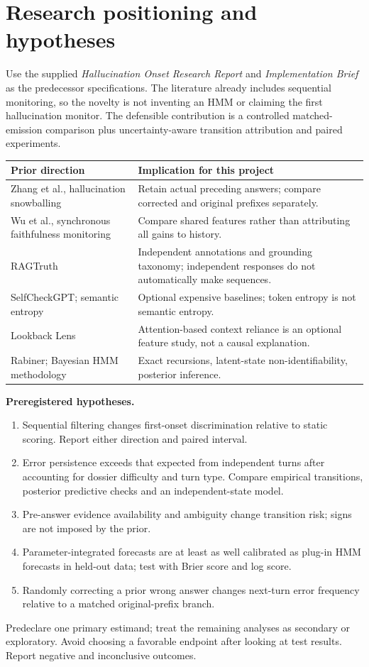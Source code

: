 \documentclass[11pt,letterpaper]{article}
\newcommand{\sectionpage}[1]{\clearpage\section{#1}}
\begin{document}
\sectionpage{Research positioning and hypotheses}
Use the supplied \emph{Hallucination Onset Research Report} and \emph{Implementation Brief} as the predecessor specifications. The literature already includes sequential monitoring, so the novelty is not inventing an HMM or claiming the first hallucination monitor. The defensible contribution is a controlled matched-emission comparison plus uncertainty-aware transition attribution and paired experiments.


\begin{tabularx}{\linewidth}{p{.32\linewidth}X}
\toprule Prior direction & Implication for this project \\ \midrule
Zhang et al., hallucination snowballing & Retain actual preceding answers; compare corrected and original prefixes separately. \\
Wu et al., synchronous faithfulness monitoring & Compare shared features rather than attributing all gains to history. \\
RAGTruth & Independent annotations and grounding taxonomy; independent responses do not automatically make sequences. \\
SelfCheckGPT; semantic entropy & Optional expensive baselines; token entropy is not semantic entropy. \\
Lookback Lens & Attention-based context reliance is an optional feature study, not a causal explanation. \\
Rabiner; Bayesian HMM methodology & Exact recursions, latent-state non-identifiability, posterior inference. \\ \bottomrule
\end{tabularx}

\textbf{Preregistered hypotheses.}
\begin{enumerate}[label=H\arabic*.]
\item Sequential filtering changes first-onset discrimination relative to static scoring. Report either direction and paired interval.
\item Error persistence exceeds that expected from independent turns after accounting for dossier difficulty and turn type. Compare empirical transitions, posterior predictive checks and an independent-state model.
\item Pre-answer evidence availability and ambiguity change transition risk; signs are not imposed by the prior.
\item Parameter-integrated forecasts are at least as well calibrated as plug-in HMM forecasts in held-out data; test with Brier score and log score.
\item Randomly correcting a prior wrong answer changes next-turn error frequency relative to a matched original-prefix branch.
\end{enumerate}
Predeclare one primary estimand; treat the remaining analyses as secondary or exploratory. Avoid choosing a favorable endpoint after looking at test results. Report negative and inconclusive outcomes.
\end{document}
